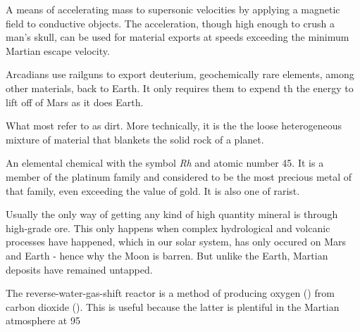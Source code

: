 {{\eTABLEbody
\eTABLE
}

A means of accelerating mass to supersonic velocities by applying a magnetic field to conductive objects. The acceleration, though high enough to crush a man's skull, can be used for material exports at speeds exceeding the minimum Martian escape velocity.

Arcadians use railguns to export deuterium, geochemically rare elements, among other materials, back to Earth. It only requires them to expend th the energy to lift off of Mars as it does Earth.

What most refer to as dirt. More technically, it is the the loose heterogeneous mixture of material that blankets the solid rock of a planet.

An elemental chemical with the symbol {\it Rh} and atomic number 45. It is a member of the platinum family and considered to be the most precious metal of that family, even exceeding the value of gold. It is also one of rarist. 

Usually the only way of getting any kind of high quantity mineral is through high-grade ore. This only happens when complex hydrological and volcanic processes have happened, which in our solar system, has only occured on Mars and Earth - hence why the Moon is barren. But unlike the Earth, Martian deposits have remained untapped.

The reverse-water-gas-shift reactor is a method of producing oxygen () from carbon dioxide (). This is useful because the latter is plentiful in the Martian atmosphere at 95\type{%

\placeformula[formula:Reverse Water Gas Shift Reaction]
\startformula
\inlinechemical{CO_2,+,H_2,+,->,O_2,+,CO}
\stopformula

The process has been known since the mid 1800s and works by reacting carbon dioxide and hydrogen gasses together over a copper-on-alumina catalyst. Aqua (liquid water) and carbon monoxide gas are produced as byproducts. The aqua is split via electrolysis to produce hydrogen and oxygen gasses. The hydrogen can then be recycled back into the reactor and the carbon monoxide purged out into the atmosphere.

The reactor needs to be at \math{400\,^{\circ}{\rm C}} and at low pressure. It requires about 180 watts of power, or about 3 \Square \Meter of solar panels on a fully sunny day's average solar flux. At that energy rate, you can expect to produce about 1 kg per day of oxygen, which is sufficient for a single person. The reactor requires power because it is an \about[Endothermic Reaction]. However, it is possible to use a \about[Sebatier Reactor] in tandem, which is an \about[Exothermic Reaction], to provide the heat required to drive the RWGS reaction.

}}
